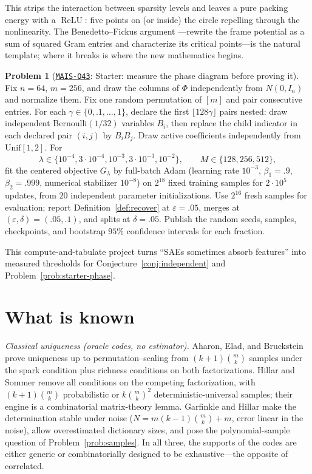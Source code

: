 \documentclass[11pt]{amsart}
\newcommand{\Oid}[1]{\href{https://github.com/lionellevine/MAIS/blob/main/open-problems/MAIS-O#1.md}{\texttt{MAIS-O#1}}}
\theoremstyle{plain}
\theoremstyle{definition}
\newtheorem{problem}[theorem]{Problem}
\DeclareMathOperator{\relu}{ReLU}
\begin{document}
This strips the interaction between sparsity levels and leaves a pure packing energy with a $\relu$: five points on (or inside) the circle repelling through the nonlinearity. The Benedetto--Fickus argument \cite{benedetto2003}---rewrite the frame potential as a sum of squared Gram entries and characterize its critical points---is the natural template; where it breaks is where the new mathematics begins.

\begin{problem}[\Oid{43}: Starter: measure the phase diagram before proving it]\label{prob:starter-numerics}
Fix $n=64$, $m=256$, and draw the columns of $\Phi$ independently from $N(0,I_n)$ and normalize them. Fix one random permutation of $[m]$ and pair consecutive entries. For each $\gamma\in\{0,.1,\dots,1\}$, declare the first $\lfloor128\gamma\rfloor$ pairs nested: draw independent Bernoulli$(1/32)$ variables $B_i$, then replace the child indicator in each declared pair $(i,j)$ by $B_iB_j$. Draw active coefficients independently from $\mathrm{Unif}[1,2]$. For
\[
\lambda\in\{10^{-4},3\cdot10^{-4},10^{-3},3\cdot10^{-3},10^{-2}\},
\qquad M\in\{128,256,512\},
\]
fit the centered objective $G_\lambda$ by full-batch Adam (learning rate $10^{-3}$, $\beta_1=.9$, $\beta_2=.999$, numerical stabilizer $10^{-8}$) on $2^{18}$ fixed training samples for $2\cdot10^5$ updates, from $20$ independent parameter initializations. Use $2^{16}$ fresh samples for evaluation; report Definition~\ref{def:recover} at $\varepsilon=.05$, merges at $(\varepsilon,\delta)=(.05,.1)$, and splits at $\delta=.05$. Publish the random seeds, samples, checkpoints, and bootstrap $95\%$ confidence intervals for each fraction.
\end{problem}

This compute-and-tabulate project turns ``SAEs sometimes absorb features'' into measured thresholds for Conjecture~\ref{conj:independent} and Problem~\ref{prob:starter-phase}.

\section{What is known}\label{sec:known}

\emph{Classical uniqueness (oracle codes, no estimator).} Aharon, Elad, and Bruckstein \cite{aharon2006} prove uniqueness up to permutation--scaling from $(k+1)\binom{m}{k}$ samples under the spark condition plus richness conditions on both factorizations. Hillar and Sommer \cite{hillar2015} remove all conditions on the competing factorization, with $(k+1)\binom{m}{k}$ probabilistic or $k\binom{m}{k}^2$ deterministic-universal samples; their engine is a combinatorial matrix-theory lemma. Garfinkle and Hillar \cite{garfinkle2019} make the determination stable under noise ($N=m(k-1)\binom{m}{k}+m$, error linear in the noise), allow overestimated dictionary sizes, and pose the polynomial-sample question of Problem~\ref{prob:samples}. In all three, the supports of the codes are either generic or combinatorially designed to be exhaustive---the opposite of correlated.
\end{document}
